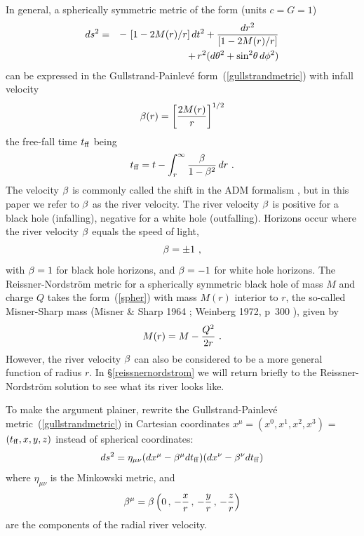 \documentclass[twocolumn,showpacs,preprintnumbers,amsmath,amssymb,prb]{revtex4}
\begin{document}
In general, a spherically symmetric metric of the form
(units $c = G = 1$)
\begin{eqnarray}
\label{spher}
  d s^2
  &=&
  - \, \left[ 1 - 2 M(r) / r \right] d t^2
  + {d r^2 \over \left[ 1 - 2 M(r) / r \right]}
\nonumber
\\
  &&
  + \, r^2 (d\theta^2 + \sin^2\!\theta \, d\phi^2)
\end{eqnarray}
can be expressed in the Gullstrand-Painlev\'e form~(\ref{gullstrandmetric})
with infall velocity
\begin{equation}
  \beta(r) = \left[ {2 M(r) \over r} \right]^{1/2}
\end{equation}
the free-fall time $t_{\rm ff}$ being
\begin{equation}
  t_{\rm ff} = t - \int_r^\infty {\beta\over 1 - \beta^2} \, d r
  \ .
\end{equation}
The velocity $\beta$ is commonly called the shift in the
ADM formalism \cite{ADM62,Lehner01},
but in this paper we refer to $\beta$ as the river velocity.
The river velocity $\beta$ is positive for a black hole (infalling),
negative for a white hole (outfalling).
Horizons occur where the river
velocity $\beta$
equals the speed of light,
\begin{equation}
  \beta = \pm 1
  \ ,
\end{equation}
with $\beta = 1$ for black hole horizons,
and $\beta = -1$ for white hole horizons.
The Reissner-Nordstr\"om metric
for a spherically symmetric black hole
of mass $M$ and charge $Q$
takes the form~(\ref{spher}) with
mass $M(r)$ interior to $r$,
the so-called Misner-Sharp mass
(Misner \& Sharp 1964 \cite{MS}; Weinberg 1972, p~300 \cite{Weinberg}),
given by
\begin{equation}
\label{rn}
  M(r) = M - {Q^2 \over 2 r}
  \ .
\end{equation}
However, the river velocity $\beta$
can also be considered to be a more general function of radius $r$.
In \S\ref{reissnernordstrom}
we will return briefly to the Reissner-Nordstr\"om solution
to see what its river looks like.

To make the argument plainer,
rewrite the Gullstrand-Painlev\'e metric~(\ref{gullstrandmetric})
in Cartesian coordinates
$x^\mu = (x^0,x^1,x^2,x^3)$
=
$(t_{\rm ff},x,y,z)$
instead of spherical coordinates:
\begin{equation}
  d s^2 =
  \eta_{\mu\nu}
  (d x^\mu - \beta^\mu d t_{\rm ff}) (d x^\nu - \beta^\nu d t_{\rm ff})
\end{equation}
where $\eta_{\mu\nu}$ is the Minkowski metric,
and
\begin{equation}
  \beta^\mu
  =
  \beta \left(
    0 \, , \, - {x \over r} \, , \, - {y \over r} \, , \, - {z \over r}
  \right)
\end{equation}
are the components of the radial river velocity.
\end{document}
